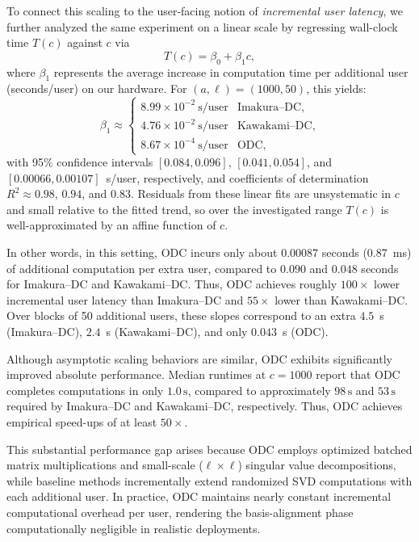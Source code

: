 \documentclass[final,3p,times]{elsarticle}
\theoremstyle{plain}
\begin{document}
To connect this scaling to the user-facing notion of \emph{incremental user latency}, we further analyzed the same experiment on a linear scale by regressing wall-clock time \(T(c)\) against \(c\) via
\begin{equation}
T(c) = \beta_0 + \beta_1 c,
\end{equation}
where \(\beta_1\) represents the average increase in computation time per additional user (seconds/user) on our hardware. For \((a,\ell)=(1000,50)\), this yields:
\begin{equation}
\beta_1 \approx
\begin{cases}
8.99\times 10^{-2}~\text{s/user} & \text{Imakura--DC},\\[2pt]
4.76\times 10^{-2}~\text{s/user} & \text{Kawakami--DC},\\[2pt]
8.67\times 10^{-4}~\text{s/user} & \text{ODC},
\end{cases}
\end{equation}
with 95\% confidence intervals \([0.084, 0.096]\), \([0.041, 0.054]\), and \([0.00066, 0.00107]\)~s/user, respectively, and coefficients of determination \(R^2 \approx 0.98\), \(0.94\), and \(0.83\). Residuals from these linear fits are unsystematic in \(c\) and small relative to the fitted trend, so over the investigated range \(T(c)\) is well-approximated by an affine function of \(c\).

In other words, in this setting, ODC incurs only about \(0.00087\) seconds (0.87~ms) of additional computation per extra user, compared to \(0.090\) and \(0.048\) seconds for Imakura--DC and Kawakami--DC. Thus, ODC achieves roughly \(100\times\) lower incremental user latency than Imakura--DC and \(55\times\) lower than Kawakami--DC. Over blocks of 50 additional users, these slopes correspond to an extra \(4.5\)~s (Imakura--DC), \(2.4\)~s (Kawakami--DC), and only \(0.043\)~s (ODC).

Although asymptotic scaling behaviors are similar, ODC exhibits significantly improved absolute performance. Median runtimes at \(c=1000\) report that ODC completes computations in only \textbf{\(1.0\,\mathrm{s}\)}, compared to approximately \(98\,\mathrm{s}\) and \(53\,\mathrm{s}\) required by Imakura--DC and Kawakami--DC, respectively. Thus, ODC achieves empirical speed-ups of at least \(50\times\).

This substantial performance gap arises because ODC employs optimized batched matrix multiplications and small-scale (\(\ell\times \ell\)) singular value decompositions, while baseline methods incrementally extend randomized SVD computations with each additional user. In practice, ODC maintains nearly constant incremental computational overhead per user, rendering the basis-alignment phase computationally negligible in realistic deployments.
\end{document}
